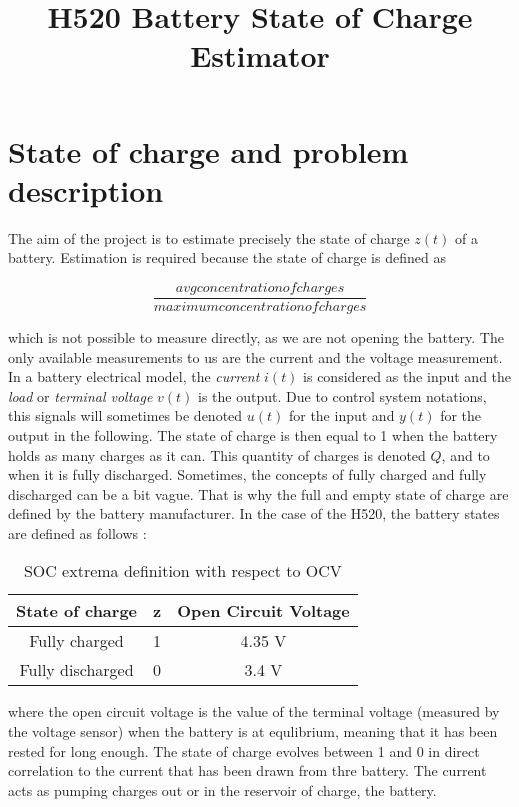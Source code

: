 \documentclass{article}
\title{H520 Battery State of Charge Estimator}
\begin{document}
 

\section{State of charge and problem description}

The aim of the project is to estimate precisely the state of charge $z(t)$ of a battery. Estimation is required because the state of charge is defined as \

\begin{equation}
\frac{avg concentration of charges}{maximum concentration of charges}
\end{equation}

which is not possible to measure directly, as we are not opening the battery. The only available measurements to us are the current and the voltage measurement. In a battery electrical model, the \textit{current} $i(t)$ is considered as the input and the \textit{load} or \textit{terminal voltage} $v(t)$ is the output. Due to control system notations, this signals will sometimes be denoted $u(t)$ for the input and $y(t)$ for the output in the following.
The state of charge is then equal to 1 when the battery holds as many charges as it can. This quantity of charges is denoted $Q$, and to when it is fully discharged. Sometimes, the concepts of fully charged and fully discharged can be a bit vague. That is why the full and empty state of charge are defined by the battery manufacturer. In the case of the H520, the battery states are defined as follows :

\begin{table}[h]
\centering
\begin{tabular}{c|c|c}
    State of charge & z & Open Circuit Voltage \\
    \hline
    Fully charged & 1 & 4.35 V \\
    \hline
    Fully discharged & 0 & 3.4 V \\

\end{tabular}
\caption{SOC extrema definition with respect to OCV}
\label{maxSOCOCV}
\end{table}

where the open circuit voltage is the value of the terminal voltage (measured by the voltage sensor) when the battery is at equlibrium, meaning that it has been rested for long enough. The state of charge evolves between 1 and 0 in direct correlation to the current that has been drawn from thre battery. The current acts as pumping charges out or in the reservoir of charge, the battery. 
\end{document}
